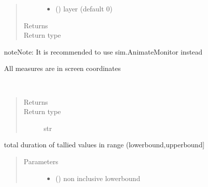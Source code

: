 \documentclass[letterpaper,10pt,english]{sphinxmanual}
\begin{document}
\begin{fulllineitems}
\begin{fulllineitems}
\begin{quote}
\begin{description}
\begin{itemize}
\item {} 
 () \textendash{} layer (default 0)

\end{itemize}

\item[{Returns}] \leavevmode
{}

\item[{Return type}] \leavevmode
{\hyperref[\detokenize{Reference:salabim.AnimateMonitor}]{}}

\end{description}\end{quote}

\begin{sphinxadmonition}{note}{Note:}
It is recommended to use sim.AnimateMonitor instead 

All measures are in screen coordinates 
\end{sphinxadmonition}

\end{fulllineitems}


\begin{fulllineitems}
\label{\detokenize{Reference:salabim.Monitor.base_name}}~\begin{quote}\begin{description}
\item[{Returns}] \leavevmode
{}

\item[{Return type}] \leavevmode
str

\end{description}\end{quote}

\end{fulllineitems}


\begin{fulllineitems}
\label{\detokenize{Reference:salabim.Monitor.bin_duration}}
total duration of tallied values in range (lowerbound,upperbound{]}
\begin{quote}\begin{description}
\item[{Parameters}] \leavevmode\begin{itemize}
\item {} 
 () \textendash{} non inclusive lowerbound


\end{itemize}
\end{description}
\end{quote}
\end{fulllineitems}
\end{fulllineitems}
\end{document}
